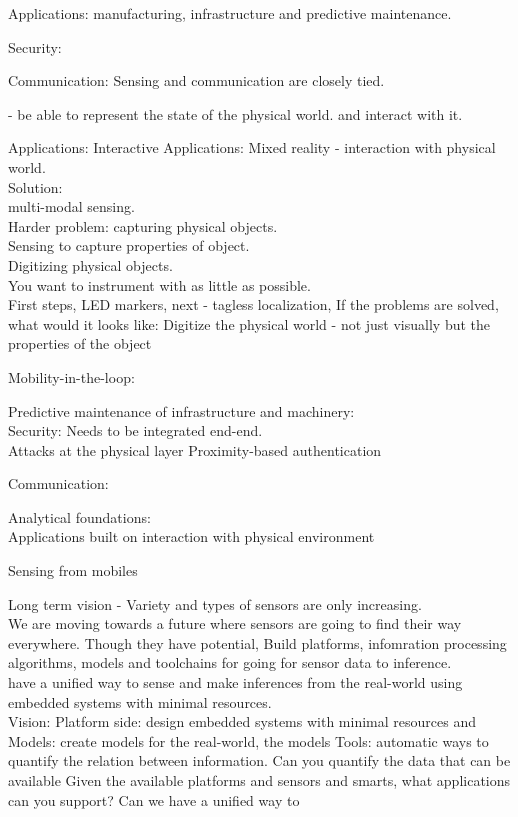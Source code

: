\documentclass[10pt]{article}
\begin{document}
Applications: manufacturing, infrastructure and predictive maintenance.

Security:

Communication: Sensing and communication are closely tied.



 - be able to represent the state of the physical world. and interact with it.

Applications:
Interactive Applications: Mixed reality - interaction with physical world.\\
Solution:\\
multi-modal sensing.\\
Harder problem: capturing physical objects. \\
Sensing to capture properties of object.\\
Digitizing physical objects.\\
You want to instrument with as little as possible.\\
First steps, LED markers, next - tagless localization, 
If the problems are solved, what would it looks like: Digitize the physical world - not just visually but the properties of the object

Mobility-in-the-loop:

Predictive maintenance of infrastructure and machinery:\\

Security:
Needs to be integrated end-end.\\
Attacks at the physical layer 
Proximity-based authentication

Communication:



Analytical foundations:\\

Applications built on interaction with physical environment 

Sensing from mobiles 


Long term vision - 
Variety and types of sensors are only increasing.\\

We are moving towards a future where sensors are going to find their way everywhere. Though they have potential, 
Build platforms, infomration processing algorithms, models and toolchains for going for sensor data to inference.\\

have a unified way to sense and make inferences from the real-world using embedded systems with minimal resources. \\
Vision:
Platform side: design embedded systems with minimal resources and \\
Models: create models for the real-world, the models 
Tools: automatic ways to quantify the relation between information. Can you quantify the data that can be available 
Given the available platforms and sensors and smarts, what applications can you support? Can we have a unified way to 
\end{document}
